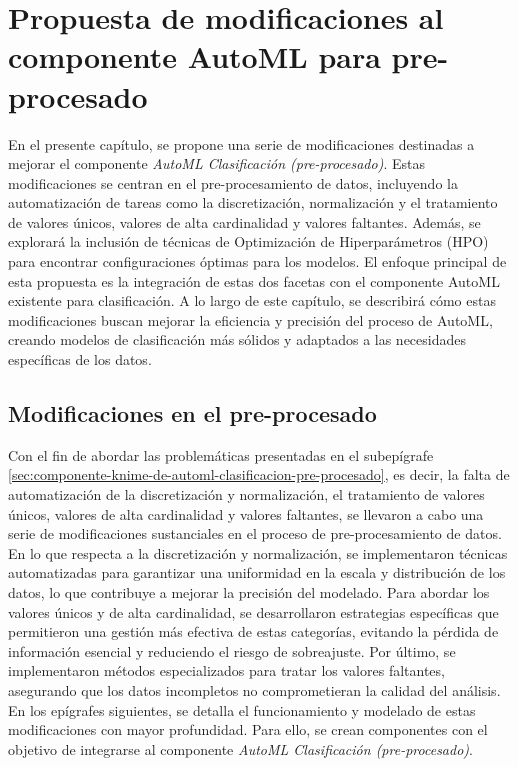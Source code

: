 \chapter{Propuesta de modificaciones al componente AutoML para pre-procesado}\label{chap:2}
En el presente capítulo, se propone una serie de modificaciones destinadas a mejorar el componente \emph{AutoML Clasificación (pre-procesado)}. Estas modificaciones se centran en el pre-procesamiento de datos, incluyendo la automatización de tareas como la discretización, normalización y el tratamiento de valores únicos, valores de alta cardinalidad y valores faltantes. Además, se explorará la inclusión de técnicas de Optimización de Hiperparámetros (HPO) para encontrar configuraciones óptimas para los modelos. El enfoque principal de esta propuesta es la integración de estas dos facetas con el componente AutoML existente para clasificación. A lo largo de este capítulo, se describirá cómo estas modificaciones buscan mejorar la eficiencia y precisión del proceso de AutoML, creando modelos de clasificación más sólidos y adaptados a las necesidades específicas de los datos.

\section{Modificaciones en el pre-procesado}
Con el fin de abordar las problemáticas presentadas en el subepígrafe \ref{sec:componente-knime-de-automl-clasificacion-pre-procesado}, es decir, la falta de automatización de la discretización y normalización, el tratamiento de valores únicos, valores de alta cardinalidad y valores faltantes, se llevaron a cabo una serie de modificaciones sustanciales en el proceso de pre-procesamiento de datos. \\
 En lo que respecta a la discretización y normalización, se implementaron técnicas automatizadas para garantizar una uniformidad en la escala y distribución de los datos, lo que contribuye a mejorar la precisión del modelado. Para abordar los valores únicos y de alta cardinalidad, se desarrollaron estrategias específicas que permitieron una gestión más efectiva de estas categorías, evitando la pérdida de información esencial y reduciendo el riesgo de sobreajuste. Por último, se implementaron métodos especializados para tratar los valores faltantes, asegurando que los datos incompletos no comprometieran la calidad del análisis. En los epígrafes siguientes, se detalla el funcionamiento y modelado de estas modificaciones con mayor profundidad. Para ello, se crean componentes con el objetivo de integrarse al componente\textit{ AutoML Clasificación (pre-procesado)}.

